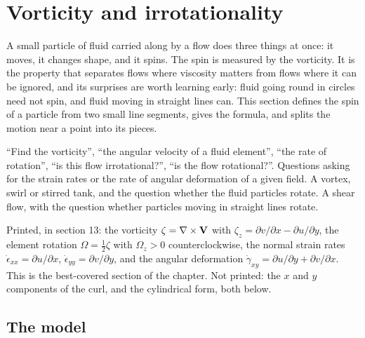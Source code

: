 \section{Vorticity and irrotationality}
\label{sec:vorticity}

A small particle of fluid carried along by a flow does three things at once: it moves, it changes shape, and it spins. The spin is measured by the vorticity. It is the property that separates flows where viscosity matters from flows where it can be ignored, and its surprises are worth learning early: fluid going round in circles need not spin, and fluid moving in straight lines can. This section defines the spin of a particle from two small line segments, gives the formula, and splits the motion near a point into its pieces.

\begin{recognise}
``Find the vorticity'', ``the angular velocity of a fluid element'', ``the rate of rotation'', ``is this flow irrotational?'', ``is the flow rotational?''. Questions asking for the strain rates or the rate of angular deformation of a given field. A vortex, swirl or stirred tank, and the question whether the fluid particles rotate. A shear flow, with the question whether particles moving in straight lines rotate.
\end{recognise}

\begin{onsheet}
Printed, in section 13: the vorticity $\zeta = \nabla\times\mathbf{V}$ with $\zeta_z = \partial v/\partial x - \partial u/\partial y$, the element rotation $\Omega = \frac12\zeta$ with $\Omega_z > 0$ counterclockwise, the normal strain rates $\dot\epsilon_{xx} = \partial u/\partial x$, $\dot\epsilon_{yy} = \partial v/\partial y$, and the angular deformation $\dot\gamma_{xy} = \partial u/\partial y + \partial v/\partial x$. This is the best-covered section of the chapter. Not printed: the $x$ and $y$ components of the curl, and the cylindrical form, both below.
\end{onsheet}

\subsection*{The model}

